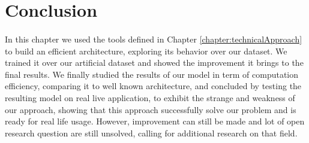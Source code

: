 \section{Conclusion}
\paragraph{}
In this chapter we used the tools defined in Chapter \ref{chapter:technicalApproach} to build an efficient architecture, exploring its behavior over our dataset. We trained it over our artificial dataset and showed the improvement it brings to the final results. We finally studied the results of our model in term of computation efficiency, comparing it to well known architecture, and concluded by testing the resulting model on real live application, to exhibit the strange and weakness of our approach, showing that this approach successfully solve our problem and is ready for real life usage. However, improvement can still be made and lot of open research question are still unsolved, calling for additional research on that field.



